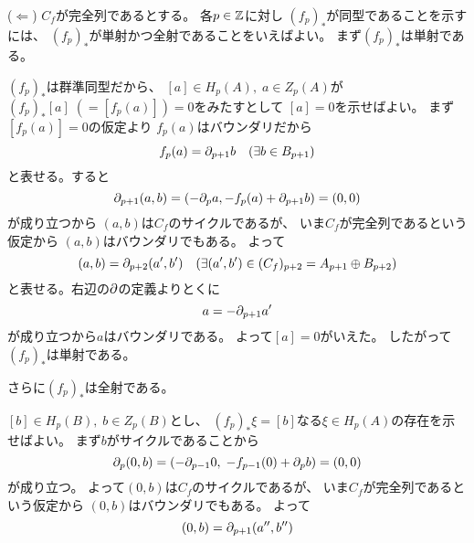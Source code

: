 \documentclass[report]{jlreq}
\begin{document}
\begin{answer}
    ($\Leftarrow$) \quad
    $C_f$が完全列であるとする。
    各$p \in \mathbb{Z}$に対し
    $(f_p)_*$が同型であることを示すには、
    $(f_p)_*$が単射かつ全射であることをいえばよい。
    まず$(f_p)_*$は単射である。
    \begin{innerproof}
        $(f_p)_*$は群準同型だから、
        $[a] \in H_p(A), \; a \in Z_p(A)$が
        $(f_p)_* [a] \; (= [f_{p}(a)]) = 0$をみたすとして
        $[a] = 0$を示せばよい。
        まず$[f_{p}(a)] = 0$の仮定より
        $f_{p}(a)$はバウンダリだから
        \begin{equation}
            f_{p}(a) = \partial_{p + 1} b
                \quad (\exists b \in B_{p + 1})
        \end{equation}
        と表せる。すると
        \begin{equation}
            \partial_{p + 1}(a, b)
                = (- \partial_{p} a, - f_{p}(a) + \partial_{p + 1} b)
                = (0, 0)
        \end{equation}
        が成り立つから
        $(a, b)$は$C_f$のサイクルであるが、
        いま$C_f$が完全列であるという仮定から
        $(a, b)$はバウンダリでもある。
        よって
        \begin{equation}
            (a, b) = \partial_{p + 2} (a', b')
                \quad (\exists (a', b') \in (C_f)_{p + 2} = A_{p + 1} \oplus B_{p + 2})
        \end{equation}
        と表せる。右辺の$\partial$の定義よりとくに
        \begin{equation}
            a = - \partial_{p + 1} a'
        \end{equation}
        が成り立つから$a$はバウンダリである。
        よって$[a] = 0$がいえた。
        したがって$(f_p)_*$は単射である。
    \end{innerproof}
    さらに$(f_p)_*$は全射である。
    \begin{innerproof}
        $[b] \in H_p(B), \; b \in Z_p(B)$とし、
        $(f_p)_* \xi = [b]$なる$\xi \in H_p(A)$の存在を示せばよい。
        まず$b$がサイクルであることから
        \begin{equation}
            \partial_{p} (0, b)
                = (- \partial_{p - 1} 0, \; - f_{p - 1}(0) + \partial_{p} b)
                = (0, 0)
        \end{equation}
        が成り立つ。
        よって$(0, b)$は$C_f$のサイクルであるが、
        いま$C_f$が完全列であるという仮定から
        $(0, b)$はバウンダリでもある。
        よって
        \begin{equation}
            (0, b) = \del_{p + 1} (a'', b'')

\end{equation}
\end{innerproof}
\end{answer}
\end{document}
